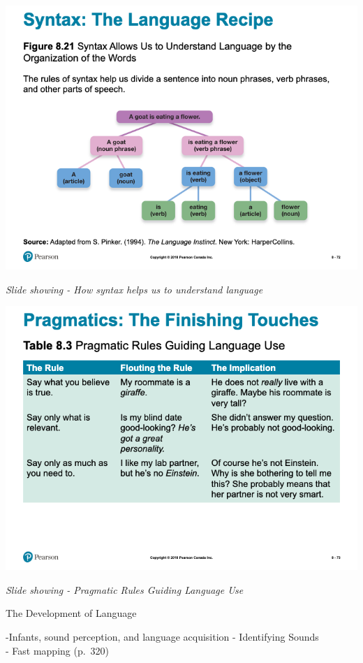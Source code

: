 \documentclass[
]{book}
\begin{document}
\includegraphics{assets/unit_1/slide_72.png}

\emph{Slide showing - How syntax helps us to understand language}

\includegraphics{assets/unit_1/slide_73.png}

\emph{Slide showing - Pragmatic Rules Guiding Language Use}

The Development of Language

-Infants, sound perception, and language acquisition
- Identifying Sounds\\
- Fast mapping (p.~320)
\end{document}
